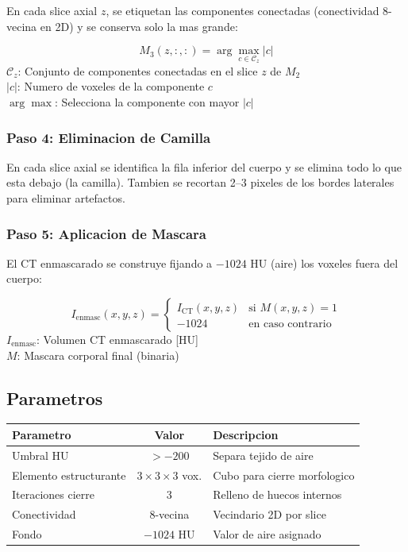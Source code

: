 \documentclass[12pt,a4paper]{article}
\newcommand{\vardef}[2]{\noindent\textbf{#1}: #2\\}
\begin{document}
En cada slice axial $z$, se etiquetan las componentes conectadas (conectividad 8-vecina en 2D)
y se conserva solo la mas grande:

\begin{equation}\label{eq:comp_conexa}
    M_3(z,:,:) = \arg\max_{c \in \mathcal{C}_z} |c|
\end{equation}
\vardef{$\mathcal{C}_z$}{Conjunto de componentes conectadas en el slice $z$ de $M_2$}
\vardef{$|c|$}{Numero de voxeles de la componente $c$}
\vardef{$\arg\max$}{Selecciona la componente con mayor $|c|$}

\subsubsection{Paso 4: Eliminacion de Camilla}

En cada slice axial se identifica la fila inferior del cuerpo y se elimina todo lo que esta
debajo (la camilla). Tambien se recortan 2--3 pixeles de los bordes laterales para eliminar
artefactos.

\subsubsection{Paso 5: Aplicacion de Mascara}

El CT enmascarado se construye fijando a $-1024$ HU (aire) los voxeles fuera del cuerpo:

\begin{equation}\label{eq:ct_masked}
    I_{\text{enmasc}}(x,y,z) = \begin{cases}
        I_{\text{CT}}(x,y,z) & \text{si } M(x,y,z) = 1 \\
        -1024 & \text{en caso contrario}
    \end{cases}
\end{equation}
\vardef{$I_{\text{enmasc}}$}{Volumen CT enmascarado [HU]}
\vardef{$M$}{Mascara corporal final (binaria)}

\subsection{Parametros}

\begin{table}[H]
\centering
\begin{tabular}{l c l}
\toprule
\textbf{Parametro} & \textbf{Valor} & \textbf{Descripcion} \\
\midrule
Umbral HU & $>-200$ & Separa tejido de aire \\
Elemento estructurante & $3\times3\times3$ vox. & Cubo para cierre morfologico \\
Iteraciones cierre & 3 & Relleno de huecos internos \\
Conectividad & 8-vecina & Vecindario 2D por slice \\
Fondo & $-1024$ HU & Valor de aire asignado \\
\bottomrule
\end{tabular}
\end{table}
\end{document}
